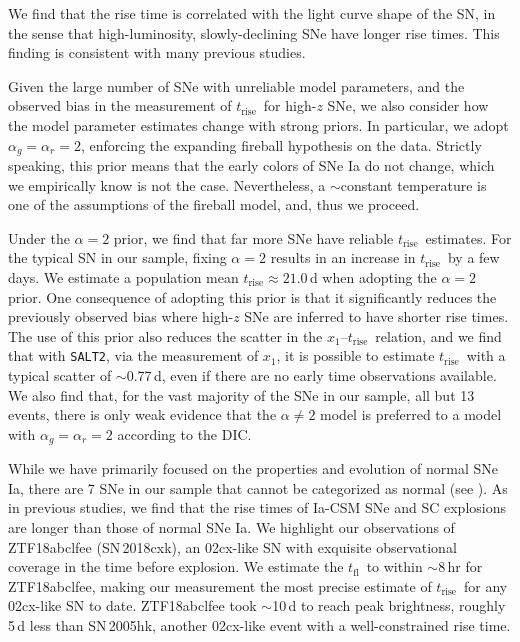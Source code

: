 \documentclass[twocolumn]{aastex63}
\newcommand{\tfl}{$t_\mathrm{fl}$}
\newcommand{\trise}{$t_\mathrm{rise}$}
\begin{document}
We find that the rise time is correlated with the light curve shape of the SN,
in the sense that high-luminosity, slowly-declining SNe have longer rise
times. This finding is consistent with many previous studies.

Given the large number of SNe with unreliable model parameters, and the
observed bias in the measurement of \trise\ for high-$z$ SNe, we also consider
how the model parameter estimates change with strong priors. In particular, we
adopt $\alpha_g = \alpha_r = 2$, enforcing the expanding fireball hypothesis
on the data. Strictly speaking, this prior means that the early colors of SNe
Ia do not change, which we empirically know is not the case. Nevertheless, a
$\sim$constant temperature is one of the assumptions of the fireball model,
and, thus we proceed.

Under the $\alpha = 2$ prior, we find that far more SNe have reliable \trise\
estimates. For the typical SN in our sample, fixing $\alpha = 2$ results in an
increase in \trise\ by a few days. We estimate a population mean \trise\;$
\approx 21.0$\,d when adopting the $\alpha = 2$ prior. One consequence of
adopting this prior is that it significantly reduces the previously observed
bias where high-$z$ SNe are inferred to have shorter rise times. The use of
this prior also reduces the scatter in the $x_1$--\trise\ relation, and we
find that with \texttt{SALT2}, via the measurement of $x_1$, it is possible to
estimate \trise\ with a typical scatter of $\sim$0.77\,d, even if there are no
early time observations available. We also find that, for the vast majority of
the SNe in our sample, all but 13 events, there is only weak evidence that the
$\alpha \ne 2$ model is preferred to a model with $\alpha_g = \alpha_r = 2$
according to the DIC.

While we have primarily focused on the properties and evolution of normal SNe
Ia, there are 7 SNe in our sample that cannot be categorized as normal (see
\citealt{Yao19}). As in previous studies, we find that the rise times of
Ia-CSM SNe and SC explosions are longer than those of normal SNe Ia. We
highlight our observations of ZTF18abclfee (SN\,2018cxk), an 02cx-like SN with
exquisite observational coverage in the time before explosion. We estimate the
\tfl\ to within $\sim$8\,hr for ZTF18abclfee, making our measurement the most
precise estimate of \trise\ for any 02cx-like SN to date. ZTF18abclfee took
$\sim$10\,d to reach peak brightness, roughly 5\,d less than SN\,2005hk,
another 02cx-like event with a well-constrained rise time.
\end{document}

